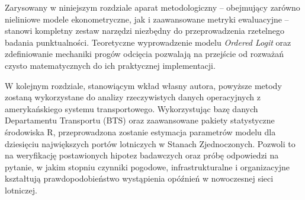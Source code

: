 Zarysowany w niniejszym rozdziale aparat metodologiczny – obejmujący zarówno nieliniowe modele ekonometryczne, jak i zaawansowane metryki ewaluacyjne – stanowi kompletny zestaw narzędzi niezbędny do przeprowadzenia rzetelnego badania punktualności. Teoretyczne wyprowadzenie modelu \textit{Ordered Logit} oraz zdefiniowanie mechaniki progów odcięcia pozwalają na przejście od rozważań czysto matematycznych do ich praktycznej implementacji.

W kolejnym rozdziale, stanowiącym wkład własny autora, powyższe metody zostaną wykorzystane do analizy rzeczywistych danych operacyjnych z amerykańskiego systemu transportowego. Wykorzystując bazę danych Departamentu Transportu (BTS) oraz zaawansowane pakiety statystyczne środowiska R, przeprowadzona zostanie estymacja parametrów modelu dla dziesięciu największych portów lotniczych w Stanach Zjednoczonych. Pozwoli to na weryfikację postawionych hipotez badawczych oraz próbę odpowiedzi na pytanie, w jakim stopniu czynniki pogodowe, infrastrukturalne i organizacyjne kształtują prawdopodobieństwo wystąpienia opóźnień w nowoczesnej sieci lotniczej.